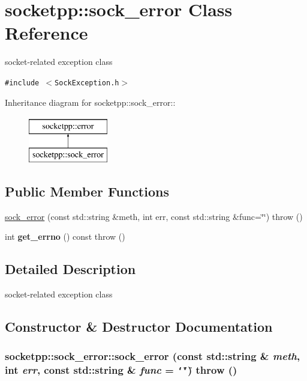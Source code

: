 \hypertarget{classsocketpp_1_1sock__error}{
\section{socketpp::sock\_\-error Class Reference}
\label{classsocketpp_1_1sock__error}
}
socket-related exception class  


{\tt \#include $<$SockException.h$>$}

Inheritance diagram for socketpp::sock\_\-error::\begin{figure}[H]
\begin{center}
\leavevmode
\includegraphics[height=2cm]{classsocketpp_1_1sock__error}
\end{center}
\end{figure}
\subsection*{Public Member Functions}
\begin{CompactItemize}
\item 
\hyperlink{classsocketpp_1_1sock__error_3d017c19f53e07e813877bac42ec535b}{sock\_\-error} (const std::string \&meth, int err, const std::string \&func=\char`\"{}\char`\"{})  throw ()
\item 
\hypertarget{classsocketpp_1_1sock__error_d1c8554e6c56880c469b23cc0ffc61de}{
int \textbf{get\_\-errno} () const   throw ()}
\label{classsocketpp_1_1sock__error_d1c8554e6c56880c469b23cc0ffc61de}

\end{CompactItemize}


\subsection{Detailed Description}
socket-related exception class 

\subsection{Constructor \& Destructor Documentation}
\hypertarget{classsocketpp_1_1sock__error_3d017c19f53e07e813877bac42ec535b}{
\subsubsection[{sock\_\-error}]{\setlength{\rightskip}{0pt plus 5cm}socketpp::sock\_\-error::sock\_\-error (const std::string \& {\em meth}, \/  int {\em err}, \/  const std::string \& {\em func} = {\tt \char`\"{}\char`\"{}})  throw ()}}
\label{classsocketpp_1_1sock__error_3d017c19f53e07e813877bac42ec535b}


